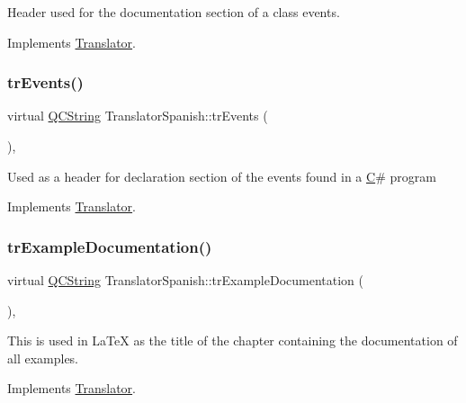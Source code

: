 Header used for the documentation section of a class\textquotesingle{} events. 

Implements \mbox{\hyperlink{class_translator}{Translator}}.

\mbox{\label{class_translator_spanish_a94d87ae4bb5c70b70875ac879bb46779}} 
\subsubsection{\texorpdfstring{trEvents()}{trEvents()}}
{\footnotesize\ttfamily virtual \mbox{\hyperlink{class_q_c_string}{Q\+C\+String}} Translator\+Spanish\+::tr\+Events (\begin{DoxyParamCaption}{ }\end{DoxyParamCaption})\hspace{0.3cm}{\ttfamily [inline]}, {\ttfamily [virtual]}}

Used as a header for declaration section of the events found in a \mbox{\hyperlink{class_c}{C}}\# program 

Implements \mbox{\hyperlink{class_translator}{Translator}}.

\mbox{\label{class_translator_spanish_ab3a6f29ce47f3e45ce1d855b6616f0c1}} 
\subsubsection{\texorpdfstring{trExampleDocumentation()}{trExampleDocumentation()}}
{\footnotesize\ttfamily virtual \mbox{\hyperlink{class_q_c_string}{Q\+C\+String}} Translator\+Spanish\+::tr\+Example\+Documentation (\begin{DoxyParamCaption}{ }\end{DoxyParamCaption})\hspace{0.3cm}{\ttfamily [inline]}, {\ttfamily [virtual]}}

This is used in La\+TeX as the title of the chapter containing the documentation of all examples. 

Implements \mbox{\hyperlink{class_translator}{Translator}}.

\mbox{\label{class_translator_spanish_a7d5179109df9846012eb67f81843fb67}} 
